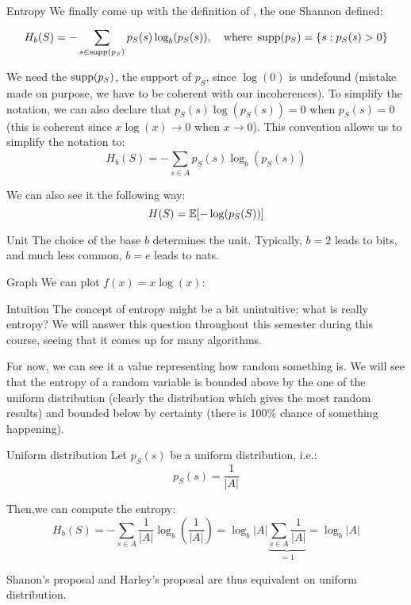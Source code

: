 \documentclass[a4paper]{article}
\begin{document}
\begin{parag}{Entropy}
    We finally come up with the definition of , the one Shannon defined: 
    \[H_b\left(S\right) = - \sum_{s \in \supp\left(p_S\right)}^{} p_S\left(s\right) \log_b\left(p_S\left(s\right)\right), \mathspace \text{where } \supp\left(p_S\right) = \left\{s: p_S\left(s\right) > 0\right\}\]

    We need the $\supp\left(p_S\right)$, the support of $p_S$, since $\log\left(0\right)$ is undefound (mistake made on purpose, we have to be coherent with our incoherences). To simplify the notation, we can also declare that $p_S\left(s\right) \log\left(p_S\left(s\right)\right) = 0$ when $p_S\left(s\right) = 0$ (this is coherent since $x \log\left(x\right) \to 0$ when $x \to 0$). This convention allows us to simplify the notation to: 
    \[H_b\left(S\right) = -\sum_{s \in A}^{} p_S\left(s\right) \log_b \left(p_S\left(s\right)\right)\]
    
    We can also see it the following way: 
    \[H\left(S\right) = \exval\left[-\log\left(p_S\left(S\right)\right)\right]\]

    \begin{subparag}{Unit}
        The choice of the base $b$ determines the unit. Typically, $b = 2$ leads to bits, and much less common, $b = e$ leads to nats.
    \end{subparag}
    
    \begin{subparag}{Graph}
        We can plot $f\left(x\right) = x \log\left(x\right)$:
    \end{subparag}

    \begin{subparag}{Intuition}
        The concept of entropy might be a bit unintuitive; what is really entropy? We will answer this question throughout this semester during this course, seeing that it comes up for many algorithms.

        For now, we can see it a value representing how random something is. We will see that the entropy of a random variable is bounded above by the one of the uniform distribution (clearly the distribution which gives the most random results) and bounded below by certainty (there is 100\% chance of something happening). 
    \end{subparag}
    
\end{parag}

\begin{parag}{Uniform distribution}
    Let $p_S\left(s\right)$ be a uniform distribution, i.e.: 
    \[p_S\left(s\right) = \frac{1}{\left|A\right|}\]
    
    Then,we can compute the entropy: 
    \[H_b\left(S\right) = -\sum_{s \in A}^{} \frac{1}{\left|A\right|} \log_b\left(\frac{1}{\left|A\right|}\right) = \log_b\left|A\right| \underbrace{\sum_{s \in A}^{} \frac{1}{\left|A\right|}}_{= 1} = \log_b \left|A\right|\]

    Shanon's proposal and Harley's proposal are thus equivalent on uniform distribution.
\end{parag}
\end{document}
